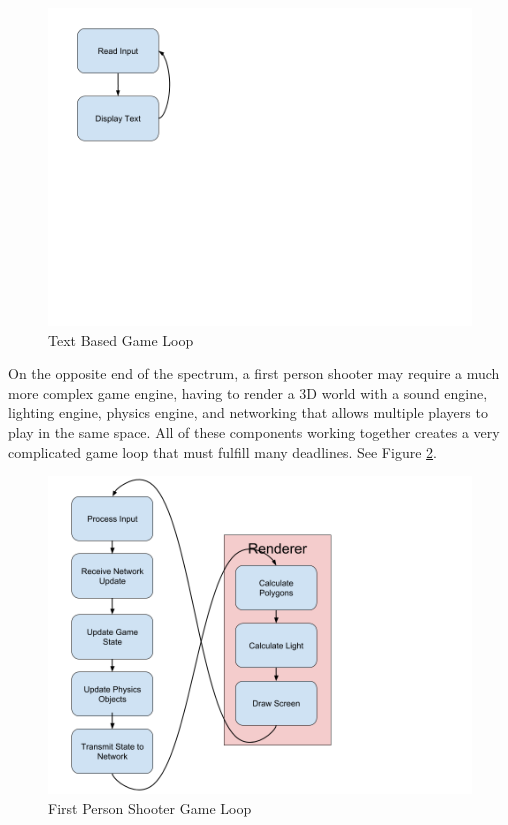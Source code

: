 \documentclass[a4paper, 12pt]{article}
\begin{document}
        \begin{figure}[H]
            \includegraphics[width=12cm]{text_based_loop.png}
            \centering
            \caption{Text Based Game Loop}
            \label{text_based_loop}
        \end{figure}

        On the opposite end of the spectrum, a first person shooter may require a much more complex game engine, having to render a 3D world with a sound engine, lighting engine, physics engine, and networking that allows multiple players to play in the same space. All of these components working together creates a very complicated game loop that must fulfill many deadlines. See Figure \ref{fps_game_loop}.

        \begin{figure}[H]
            \includegraphics[width=12cm]{fps_loop.png}
            \centering
            \caption{First Person Shooter Game Loop}
            \label{fps_game_loop}
        \end{figure}
\end{document}
